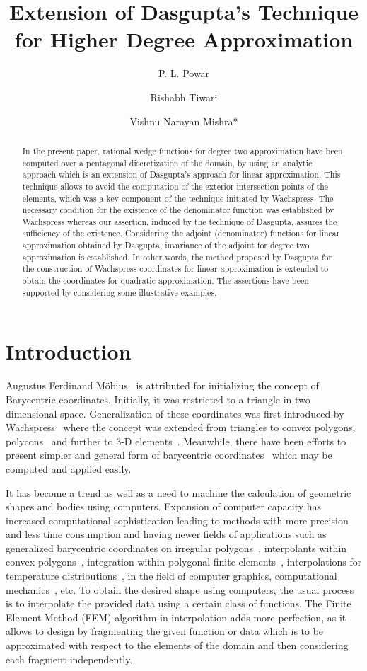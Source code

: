 \documentclass[automatic-bibliography, defaultmaths=false]{univsciauth}
\title{Extension of Dasgupta's Technique for Higher Degree Approximation}
\author[1]{P. L. Powar}
\author[1]{Rishabh Tiwari}
\author[2]{Vishnu Narayan Mishra*}
\begin{document}
\maketitle
\thispagestyle{firstpage}

\begin{abstract}
In the present paper, rational wedge functions for degree two approximation have
been computed over a pentagonal discretization of the domain, by using an
analytic approach which is an extension of Dasgupta\rq{}s approach for linear
approximation. This technique allows to avoid the computation of the exterior
intersection points of the elements, which was a key component of the technique
initiated by Wachspress. The necessary condition for the existence of the
denominator function was established by Wachspress whereas our assertion,
induced by the technique of Dasgupta, assures the sufficiency of the existence.
Considering the adjoint (denominator) functions for linear approximation
obtained by Dasgupta, invariance of the adjoint for degree two approximation is
established. In other words, the method proposed by Dasgupta for the
construction of Wachspress coordinates for linear approximation is extended to
obtain the coordinates for quadratic approximation. The assertions have been
supported by considering some illustrative examples.

\end{abstract}

\section{Introduction}
Augustus Ferdinand M\"obius~\cite{mo} is attributed for initializing the concept
of Barycentric coordinates. Initially, it was restricted to a triangle in two
dimensional space. Generalization of these coordinates was first introduced by
Wachspress~\cite{wach71} where the concept was extended from triangles to convex
polygons, polycons~\cite{wach73} and further to 3-D elements~\cite{warren, wach,
wachs}. Meanwhile, there have been efforts to present simpler and general form
of barycentric coordinates~\cite{1,2,3,4,5,6} which may be computed and applied
easily.

It has become a trend as well as a need to machine the calculation of geometric
shapes and bodies using computers. Expansion of computer capacity has increased
computational sophistication leading to methods with more precision and less
time consumption and having newer fields of applications such as generalized
barycentric coordinates on irregular polygons~\cite{7}, interpolants within
convex polygons~\cite{das}, integration within polygonal finite
elements~\cite{9}, interpolations for temperature distributions~\cite{10}, in
the field of computer graphics, computational mechanics~\cite{11}, etc. To
obtain the desired shape using computers, the usual process is to interpolate
the provided data using a certain class of functions. The Finite Element Method
(FEM) algorithm in interpolation adds more perfection, as it allows to design by
fragmenting the given function or data which is to be approximated with respect
to the elements of the domain and then considering each fragment independently.
\end{document}
